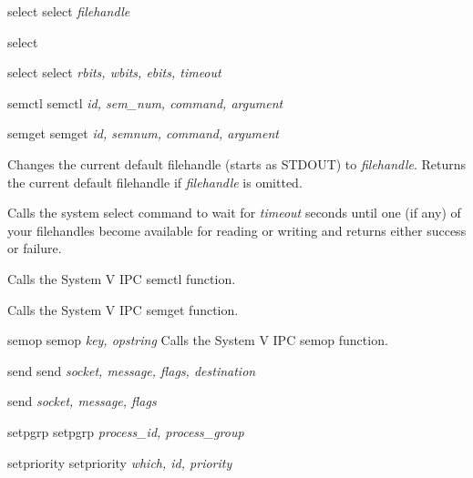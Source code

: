 \documentclass[a4paper,11pt]{book}
\begin{document}
\noindent 

\noindent select select \textit{filehandle}

\noindent 

\noindent select

\noindent 

\noindent 

\noindent select select \textit{rbits, wbits, ebits, timeout}

\noindent 

\noindent 

\noindent 

\noindent 

\noindent semctl semctl \textit{id, sem\_num, command, argument}

\noindent 

\noindent semget semget \textit{id, semnum, command, argument}

\noindent 

\noindent Changes the current default filehandle (starts as STDOUT) to \textit{filehandle}. Returns the current default filehandle if \textit{filehandle }is omitted.

\noindent 

\noindent Calls the system select command to wait for \textit{timeout }seconds until one (if any) of your filehandles become available for reading or writing and returns either success or failure.

\noindent 

\noindent Calls the System V IPC semctl function.

\noindent 

\noindent 

\noindent Calls the System V IPC semget function.

\noindent 

\noindent semop semop \textit{key, opstring }Calls the System V IPC semop function.

\noindent 

\noindent send send \textit{socket, message, flags, destination}

\noindent 

\noindent send \textit{socket, message, flags}

\noindent 

\noindent setpgrp setpgrp \textit{process\_id, process\_group}

\noindent 

\noindent 

\noindent setpriority setpriority \textit{which, id, priority}
\end{document}

